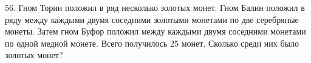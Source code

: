 56. Гном Торин положил в ряд несколько золотых монет. Гном Балин положил в ряду между каждыми двумя соседними золотыми монетами по две серебряные монеты. Затем гном Буфор положил между каждыми двумя соседними монетами по одной медной монете. Всего получилось 25 монет. Сколько среди них было золотых монет?\\
